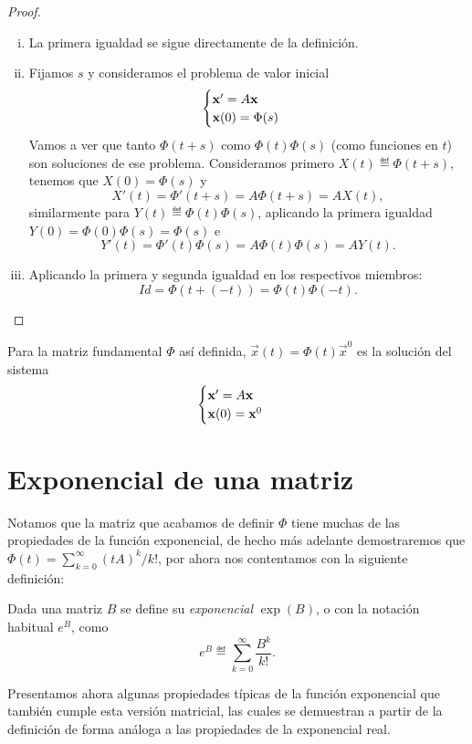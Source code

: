 \documentclass[../ecuaciones_diferenciales.tex]{subfiles}
\begin{document}
\begin{proof}
	\begin{enumerate}[(i), wide, labelwidth=0pt, labelindent=0pt]
		\item La primera igualdad se sigue directamente de la definición.

		\item Fijamos \(s\) y consideramos el problema de valor inicial
			\[\begin{cases}\mathbf{x}' = A\mathbf{x} \\ \mathbf{x}(0) = \Phi(s) \end{cases}\]
		      Vamos a ver que tanto \(\Phi(t + s)\) como \(\Phi(t)\Phi(s)\) (como
		      funciones en \(t\)) son soluciones de ese problema. Consideramos
		      primero \(X(t) \eqdef \Phi(t + s)\), tenemos que \(X(0) = \Phi(s)\) y
		      \[X'(t) = \Phi'(t + s) = A \Phi(t + s) = A X(t),\]
		      similarmente para \(Y(t) \eqdef \Phi(t)\Phi(s)\), aplicando la primera
		      igualdad \(Y(0) = \Phi(0)\Phi(s) = \Phi(s)\) e
		      \[Y'(t) = \Phi'(t)\Phi(s) = A \Phi(t)\Phi(s) = A Y(t).\]

		\item Aplicando la primera y segunda igualdad en los respectivos
		      miembros:
		      \[\mathit{Id} = \Phi(t + (-t)) = \Phi(t)\Phi(-t).\]
	\end{enumerate}
\end{proof}

Para la matriz fundamental \(\Phi\) así definida, 
\(\vec{x}(t) = \Phi(t)\vec{x}^0\) es la solución del sistema
\[\begin{cases}\mathbf{x}' = A\mathbf{x} \\ \mathbf{x}(0) = \mathbf{x}^0\end{cases}\]

\section{Exponencial de una matriz}

Notamos que la matriz que acabamos de definir \(\Phi\) tiene muchas de las
propiedades de la función exponencial, de hecho más adelante demostraremos que
\(\Phi(t) = \sum_{k=0}^\infty {(tA)}^k/{k!}\), por ahora nos contentamos con la
siguiente definición:

\begin{definition}
	Dada una matriz \(B\) se define su \emph{exponencial} \(\exp(B)\), o con la
    notación habitual \(e^B\), como
	\[e^B \eqdef \sum_{k = 0}^\infty \frac{B^k}{k!}.\]
\end{definition}

Presentamos ahora algunas propiedades típicas de la función exponencial que
también cumple esta versión matricial, las cuales se demuestran a partir de la
definición de forma análoga a las propiedades de la exponencial real.
\end{document}
